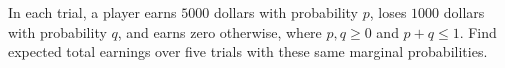 In each trial, a player earns $5000$ dollars with probability $p$, loses $1000$ dollars with probability $q$, and earns zero otherwise, where $p,q\ge0$ and $p+q\le1$. Find expected total earnings over five trials with these same marginal probabilities.
